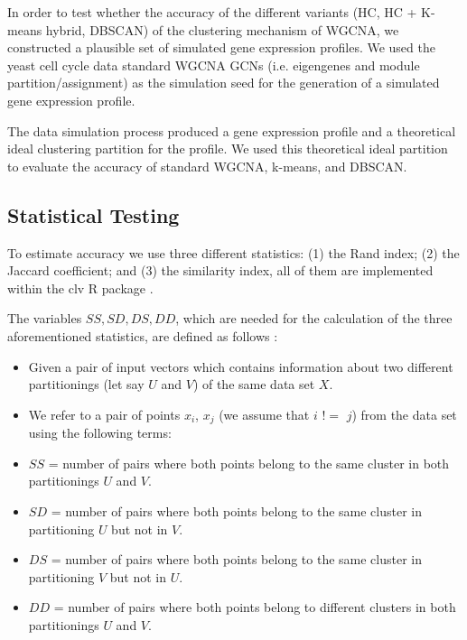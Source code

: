 \documentclass[sigconf,authordraft]{acmart}
\begin{document}
In order to test whether the accuracy of the different variants (HC, HC + K-means hybrid, DBSCAN) of the clustering mechanism of WGCNA, we constructed a plausible set of simulated gene expression profiles. We used the yeast cell cycle data standard WGCNA GCNs (i.e. eigengenes and module partition/assignment) as the simulation seed for the generation of a simulated gene expression profile. 

The data simulation process produced a gene expression profile and a theoretical ideal clustering partition for the profile. We used this theoretical ideal partition to evaluate the accuracy of standard WGCNA, k-means, and DBSCAN. 

\subsection{Statistical Testing}

To estimate accuracy we use three different statistics: (1) the Rand index; (2) the Jaccard coefficient; and (3) the similarity index, all of them are implemented within the clv R package \cite{clvPackage}.

The variables $SS, SD, DS, DD$, which are needed for the calculation of the three aforementioned statistics, are defined as follows \cite{clvPackage}:

\begin{itemize}
	\item Given a pair of input vectors which contains information about two different partitionings (let say $U$ and $V$) of the same data set $X$.

	\item We refer to a pair of points $x_i$, $x_j$ (we assume that $i $ $!=$ $j$) from the data set using the following terms:
	
	\item $SS$ = number of pairs where both points belong to the same cluster in both partitionings $U$ and $V$.
	
	\item $SD$ = number of pairs where both points belong to the same cluster in partitioning $U$ but not in $V$.
	
	\item $DS$ = number of pairs where both points belong to the same cluster in partitioning $V$ but not in $U$.
	
	\item $DD$ = number of pairs where both points belong to different clusters in both partitionings $U$ and $V$.
\end{itemize}
\end{document}
